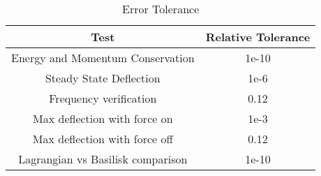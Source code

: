\begin{table}[htbp]
	\caption{Error Tolerance}
	\label{tab:errortol}
	\centering \fontsize{10}{10}\selectfont
	\begin{tabular}{| c | c |} %
		\hline
		Test   & Relative Tolerance \\
		\hline
		Energy and Momentum Conservation & 1e-10 \\
		\hline
		Steady State Deflection & 1e-6 \\
		\hline
		Frequency verification & 0.12 \\
		\hline
		Max deflection with force on & 1e-3 \\
		\hline
		Max deflection with force off & 0.12 \\
		\hline
		Lagrangian vs Basilisk comparison & 1e-10 \\
		\hline	
	\end{tabular}
\end{table}

\clearpage
